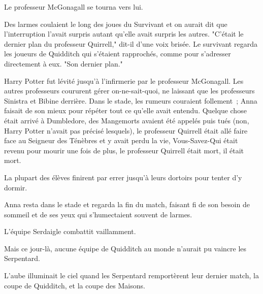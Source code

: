 Le professeur McGonagall se tourna vers lui.

Des larmes coulaient le long des joues du Survivant et on aurait dit que l'interruption l'avait surpris autant qu'elle avait surpris les autres. "C'était le dernier plan du professeur Quirrell," dit-il d'une voix brisée. Le survivant regarda les joueurs de Quidditch qui s'étaient rapprochés, comme pour s'adresser directement à eux. "Son dernier plan."

Harry Potter fut lévité jusqu'à l'infirmerie par le professeur McGonagall. Les autres professeurs coururent gérer on-ne-sait-quoi, ne laissant que les professeurs Sinistra et Bibine derrière. Dans le stade, les rumeurs couraient follement~; Anna faisait de son mieux pour répéter tout ce qu'elle avait entendu. Quelque chose était arrivé à Dumbledore, des Mangemorts avaient été appelés puis tués (non, Harry Potter n'avait pas précisé lesquels), le professeur Quirrell était allé faire face au Seigneur des Ténèbres et y avait perdu la vie, Vous-Savez-Qui était revenu pour mourir une fois de plus, le professeur Quirrell était mort, il était mort.

La plupart des élèves finirent par errer jusqu'à leurs dortoirs pour tenter d'y dormir.

Anna resta dans le stade et regarda la fin du match, faisant fi de son besoin de sommeil et de ses yeux qui s'humectaient souvent de larmes.

L'équipe Serdaigle combattit vaillamment.

Mais ce jour-là, aucune équipe de Quidditch au monde n'aurait pu vaincre les Serpentard.

L'aube illuminait le ciel quand les Serpentard remportèrent leur dernier match, la coupe de Quidditch, et la coupe des Maisons. 

